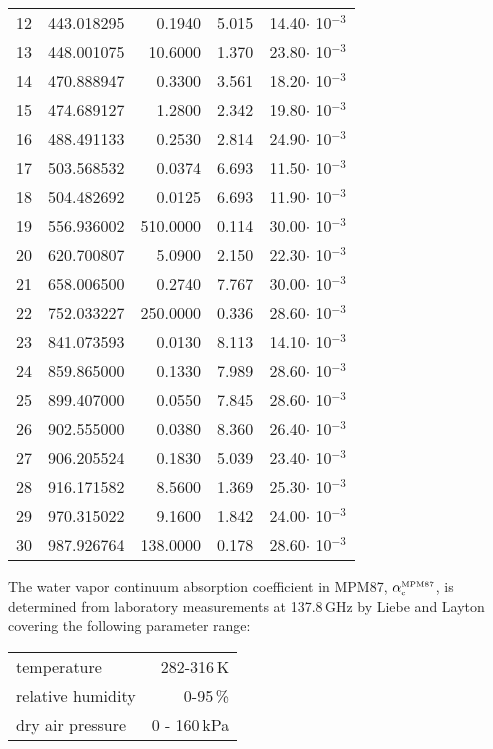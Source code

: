 \begin{longtable}{rrrrr}
12    &   443.018295&    0.1940&  5.015&   14.40$\cdot$ 10$^{-3}$\\
13    &   448.001075&   10.6000&  1.370&   23.80$\cdot$ 10$^{-3}$\\
14    &   470.888947&    0.3300&  3.561&   18.20$\cdot$ 10$^{-3}$\\
15    &   474.689127&    1.2800&  2.342&   19.80$\cdot$ 10$^{-3}$\\
16    &   488.491133&    0.2530&  2.814&   24.90$\cdot$ 10$^{-3}$\\
17    &   503.568532&    0.0374&  6.693&   11.50$\cdot$ 10$^{-3}$\\
18    &   504.482692&    0.0125&  6.693&   11.90$\cdot$ 10$^{-3}$\\
19    &   556.936002&  510.0000&  0.114&   30.00$\cdot$ 10$^{-3}$\\
20    &   620.700807&    5.0900&  2.150&   22.30$\cdot$ 10$^{-3}$\\
21    &   658.006500&    0.2740&  7.767&   30.00$\cdot$ 10$^{-3}$\\
22    &   752.033227&  250.0000&  0.336&   28.60$\cdot$ 10$^{-3}$\\
23    &   841.073593&    0.0130&  8.113&   14.10$\cdot$ 10$^{-3}$\\
24    &   859.865000&    0.1330&  7.989&   28.60$\cdot$ 10$^{-3}$\\
25    &   899.407000&    0.0550&  7.845&   28.60$\cdot$ 10$^{-3}$\\
26    &   902.555000&    0.0380&  8.360&   26.40$\cdot$ 10$^{-3}$\\
27    &   906.205524&    0.1830&  5.039&   23.40$\cdot$ 10$^{-3}$\\
28    &   916.171582&    8.5600&  1.369&   25.30$\cdot$ 10$^{-3}$\\
29    &   970.315022&    9.1600&  1.842&   24.00$\cdot$ 10$^{-3}$\\
30    &   987.926764&  138.0000&  0.178&   28.60$\cdot$ 10$^{-3}$\\
\hline
\end{longtable}
%
%
\label{levele:h2o_mpm87_cont}
The water vapor continuum absorption coefficient in MPM87, $\alpha^{\mbox{\rm \tiny MPM87}}_{\mbox{\tiny c}}$, 
is determined from laboratory measurements at 137.8\,GHz by Liebe 
and Layton covering the following parameter range:\\
\begin{tabular}{lr}
temperature          & 282-316\,K\\
relative humidity    & 0-95\,\%\\
dry air pressure     & 0 - 160\,kPa\\ 
\end{tabular}\\
